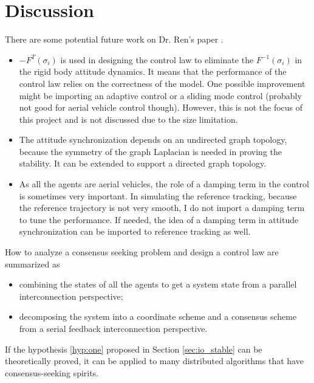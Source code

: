 \section{Discussion}
\label{sec:summary}

There are some potential future work on Dr. Ren's paper \cite{5229134}.
\begin{itemize}
\item $ - F^{T}(\sigma_{i}) $ is used in designing the control law to eliminate the $ F^{-1}(\sigma_{i}) $ in the rigid body attitude dynamics.
It means that the performance of the control law relies on the correctness of the model.
One possible improvement might be importing an adaptive control or a sliding mode control (probably not good for aerial vehicle control though). 
However, this is not the focus of this project and is not discussed due to the size limitation.
\item The attitude synchronization depends on an undirected graph topology, because the symmetry of the graph Laplacian is needed in proving the stability.
It can be extended to support a directed graph topology.
\item As all the agents are aerial vehicles, the role of a damping term in the control is sometimes very important.
In simulating the reference tracking, because the reference trajectory is not very smooth, I do not import a damping term to tune the performance.
If needed, the idea of a damping term in attitude synchronization can be imported to reference tracking as well.
\end{itemize}

How to analyze a consensus seeking problem and design a control law are summarized as
\begin{itemize}
\item combining the states of all the agents to get a system state from a parallel interconnection perspective;
\item decomposing the system into a coordinate scheme and a consensus scheme from a serial feedback interconnection perspective.
\end{itemize}
If the hypothesis \ref{hyp:one} proposed in Section \ref{sec:io_stable} can be theoretically proved, it can be applied to many distributed algorithms that have consensus-seeking spirits.